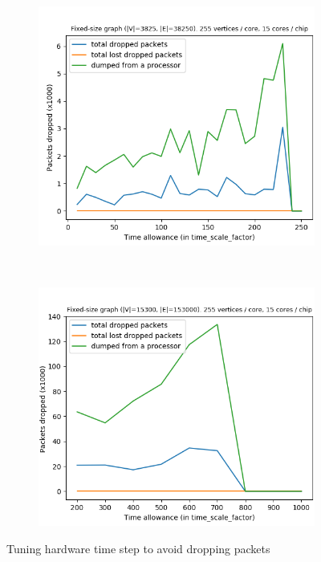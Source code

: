 \begin{figure}[!ht]
    \centering
    \begin{subfigure}[b]{0.5\textwidth}
        \includegraphics[width=\textwidth]{figures/packet_drop_vs_time_scale_factor-1.png}
        \caption{} \label{fig:graph11}
    \end{subfigure}%
    ~ %
    \begin{subfigure}[b]{0.5\textwidth}
        \includegraphics[width=\textwidth]{figures/packet_drop_vs_time_scale_factor-2.png}
        \caption{} \label{fig:graph12}
    \end{subfigure}
    \caption{Tuning hardware time step to avoid dropping packets}
    \label{fig:graph1}
\end{figure} 

